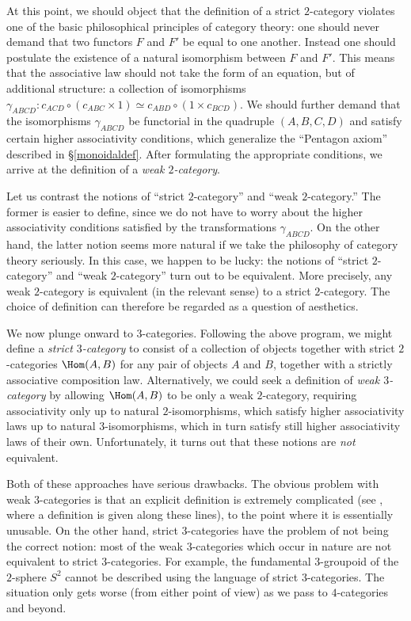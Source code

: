 At this point, we should object that the definition of a strict
$2$-category violates one of the basic philosophical principles of
category theory: one should never demand that two functors $F$ and $F'$ be
equal to one another. Instead one should postulate the existence of a natural
isomorphism between $F$ and $F'$. This means that the associative
law should not take the form of an equation, but of additional
structure: a collection of isomorphisms $\gamma_{ABCD}: c_{ACD} \circ
(c_{ABC} \times 1) \simeq c_{ABD} \circ (1 \times c_{BCD})$. We
should further demand that the isomorphisms $\gamma_{ABCD}$ be
functorial in the quadruple $(A,B,C,D)$ and satisfy
certain higher associativity conditions, which generalize the ``Pentagon axiom''
described in \S \ref{monoidaldef}. After formulating the
appropriate conditions, we arrive at the definition of a {\it weak
$2$-category}.

Let us contrast the notions of ``strict $2$-category'' and ``weak
$2$-category.'' The former is easier to define, since we do not
have to worry about the higher associativity conditions satisfied
by the transformations $\gamma_{ABCD}$. On the other hand, the
latter notion seems more natural if we take the philosophy of
category theory seriously. In this case, we happen to be lucky:
the notions of ``strict $2$-category'' and ``weak $2$-category''
turn out to be equivalent. More precisely, any weak $2$-category
is equivalent (in the relevant sense) to a strict $2$-category. The
choice of definition can therefore be regarded as a question of
aesthetics.

We now plunge onward to $3$-categories. Following the above
program, we might define a {\it strict $3$-category} to consist of a
collection of objects together with strict $2$-categories
$\Hom(A,B)$ for any pair of objects $A$ and $B$, together with a
strictly associative composition law. Alternatively, we could seek
a definition of {\it weak $3$-category} by allowing $\Hom(A,B)$ to
be only a weak $2$-category, requiring associativity only up to
natural $2$-isomorphisms, which satisfy higher associativity laws
up to natural $3$-isomorphisms, which in turn satisfy still higher
associativity laws of their own. Unfortunately, it turns out that
these notions are {\em not} equivalent.

Both of these approaches have serious drawbacks. The obvious
problem with weak $3$-categories is that an explicit definition is
extremely complicated (see \cite{tricat}, where a definition is given along these lines), to the point where it is
essentially unusable. On the other hand, strict $3$-categories
have the problem of not being the correct notion: most of the weak
$3$-categories which occur in nature are not equivalent to
strict $3$-categories. For example, the fundamental $3$-groupoid of
the $2$-sphere $S^2$ cannot be described using the language of
strict $3$-categories. The situation only gets worse (from either
point of view) as we pass to $4$-categories and beyond.

